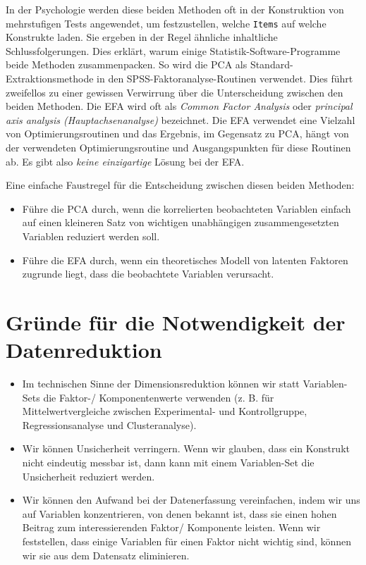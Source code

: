 \documentclass[12pt,ngerman,]{book}
\providecommand{\tightlist}{%
  \setlength{\itemsep}{0pt}\setlength{\parskip}{0pt}}
\begin{document}
In der Psychologie werden diese beiden Methoden oft in der Konstruktion
von mehrstufigen Tests angewendet, um festzustellen, welche
\texttt{Items} auf welche Konstrukte laden. Sie ergeben in der Regel
ähnliche inhaltliche Schlussfolgerungen. Dies erklärt, warum einige
Statistik-Software-Programme beide Methoden zusammenpacken. So wird die
PCA als Standard-Extraktionsmethode in den SPSS-Faktoranalyse-Routinen
verwendet. Dies führt zweifellos zu einer gewissen Verwirrung über die
Unterscheidung zwischen den beiden Methoden. Die EFA wird oft als
\emph{Common Factor Analysis} oder \emph{principal axis analysis
(Hauptachsenanalyse)} bezeichnet. Die EFA
verwendet eine Vielzahl von Optimierungsroutinen und das Ergebnis, im
Gegensatz zu PCA, hängt von der verwendeten Optimierungsroutine und
Ausgangspunkten für diese Routinen ab. Es gibt also \emph{keine
einzigartige} Lösung bei der EFA.

Eine einfache Faustregel für die Entscheidung zwischen diesen beiden
Methoden:

\begin{itemize}
\tightlist
\item
  Führe die PCA durch, wenn die korrelierten beobachteten Variablen
  einfach auf einen kleineren Satz von wichtigen unabhängigen
  zusammengesetzten Variablen reduziert werden soll.
\item
  Führe die EFA durch, wenn ein theoretisches Modell von latenten
  Faktoren zugrunde liegt, dass die beobachtete Variablen verursacht.
\end{itemize}

\section{Gründe für die Notwendigkeit der
Datenreduktion}\label{grunde-fur-die-notwendigkeit-der-datenreduktion}

\begin{itemize}
\tightlist
\item
  Im technischen Sinne der Dimensionsreduktion können wir statt
  Variablen-Sets die Faktor-/ Komponentenwerte verwenden (z. B. für
  Mittelwertvergleiche zwischen Experimental- und Kontrollgruppe,
  Regressionsanalyse und Clusteranalyse).
\item
  Wir können Unsicherheit verringern. Wenn wir glauben, dass ein
  Konstrukt nicht eindeutig messbar ist, dann kann mit einem
  Variablen-Set die Unsicherheit reduziert werden.
\item
  Wir können den Aufwand bei der Datenerfassung vereinfachen, indem wir
  uns auf Variablen konzentrieren, von denen bekannt ist, dass sie einen
  hohen Beitrag zum interessierenden Faktor/ Komponente leisten. Wenn
  wir feststellen, dass einige Variablen für einen Faktor nicht wichtig
  sind, können wir sie aus dem Datensatz eliminieren.
\end{itemize}
\end{document}
